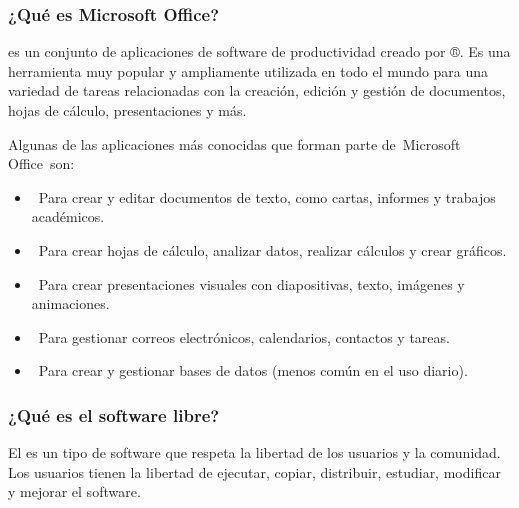\documentclass[letterpaper,10pt,spanish]{sphinxmanual}
\begin{document}
\subsubsection{¿Qué es Microsoft Office?}
\label{\detokenize{1_guias/10ofimatica/G1019:que-es-microsoft-office}}
\sphinxAtStartPar
{} es un conjunto de aplicaciones de software de productividad creado por ®. Es una herramienta muy popular y ampliamente utilizada en todo el mundo para una variedad de tareas relacionadas con la creación, edición y gestión de documentos, hojas de cálculo, presentaciones y más.

\sphinxAtStartPar
Algunas de las aplicaciones más conocidas que forman parte de Microsoft Office son:
\begin{itemize}
\item {} 
\sphinxAtStartPar
{} Para crear y editar documentos de texto, como cartas, informes y trabajos académicos.

\item {} 
\sphinxAtStartPar
{} Para crear hojas de cálculo, analizar datos, realizar cálculos y crear gráficos.

\item {} 
\sphinxAtStartPar
{} Para crear presentaciones visuales con diapositivas, texto, imágenes y animaciones.

\item {} 
\sphinxAtStartPar
{} Para gestionar correos electrónicos, calendarios, contactos y tareas.

\item {} 
\sphinxAtStartPar
{} Para crear y gestionar bases de datos (menos común en el uso diario).

\end{itemize}


\subsubsection{¿Qué es el software libre?}
\label{\detokenize{1_guias/10ofimatica/G1019:que-es-el-software-libre}}
\sphinxAtStartPar
El  es un tipo de software que respeta la libertad de los usuarios y la comunidad. Los usuarios tienen la libertad de ejecutar, copiar, distribuir, estudiar, modificar y mejorar el software.
\end{document}
